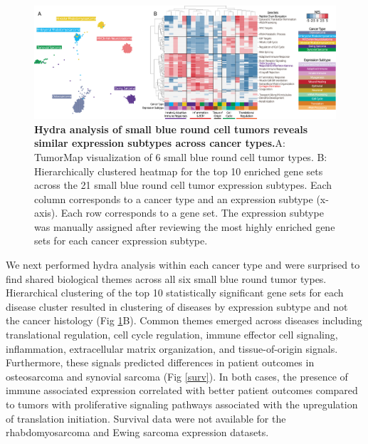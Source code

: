 \documentclass[10pt,letterpaper]{article}
\begin{document}
\begin{figure}[!h]
	\includegraphics[width=1.05\textwidth]{img/PNG/pan-cancer-figure-V4}
	\caption{{\bf Hydra analysis of small blue round cell tumors reveals similar expression subtypes across cancer types.}A: TumorMap visualization of 6 small blue round cell tumor types. B: Hierarchically clustered heatmap for the top 10 enriched gene sets across the 21 small blue round cell tumor expression subtypes. Each column corresponds to a cancer type and an expression subtype (x-axis). Each row corresponds to a gene set. The expression subtype was manually assigned after reviewing the most highly enriched gene sets for each cancer expression subtype.}
	\label{pancan}
\end{figure}

We next performed hydra analysis within each cancer type and were surprised to find shared biological themes across all six small blue round tumor types. Hierarchical clustering of the top 10 statistically significant gene sets for each disease cluster resulted in clustering of diseases by expression subtype and not the cancer histology (Fig \ref{pancan}B). Common themes emerged across diseases including translational regulation, cell cycle regulation, immune effector cell signaling, inflammation, extracellular matrix organization, and tissue-of-origin signals. Furthermore, these signals predicted differences in patient outcomes in osteosarcoma and synovial sarcoma (Fig \ref{surv}). In both cases, the presence of immune associated expression correlated with better patient outcomes compared to tumors with proliferative signaling pathways associated with the upregulation of translation initiation. Survival data were not available for the rhabdomyosarcoma and Ewing sarcoma expression datasets.

%
%
\end{document}
